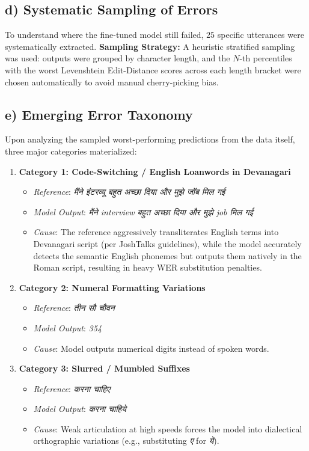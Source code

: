 \documentclass[11pt]{article}
\begin{document}
\subsection*{d) Systematic Sampling of Errors}
To understand where the fine-tuned model still failed, $25$ specific utterances were systematically extracted. \textbf{Sampling Strategy:} A heuristic stratified sampling was used: outputs were grouped by character length, and the $N$-th percentiles with the worst Levenshtein Edit-Distance scores across each length bracket were chosen automatically to avoid manual cherry-picking bias.

\subsection*{e) Emerging Error Taxonomy}
Upon analyzing the sampled worst-performing predictions from the data itself, three major categories materialized:
\begin{enumerate}[leftmargin=*]
    \def\labelitemi{--}
    \item \textbf{Category 1: Code-Switching / English Loanwords in Devanagari}
    \begin{itemize}[noitemsep]
        \item \textit{Reference}: \textsl{\texthindi{मैंने इंटरव्यू बहुत अच्छा दिया और मुझे जॉब मिल गई}} 
        \item \textit{Model Output}: \textsl{\texthindi{मैंने interview बहुत अच्छा दिया और मुझे job मिल गई}}
        \item \textit{Cause}: The reference aggressively transliterates English terms into Devanagari script (per JoshTalks guidelines), while the model accurately detects the semantic English phonemes but outputs them natively in the Roman script, resulting in heavy WER substitution penalties.
    \end{itemize}
    \item \textbf{Category 2: Numeral Formatting Variations}
    \begin{itemize}[noitemsep]
        \item \textit{Reference}: \textsl{\texthindi{तीन सौ चौवन}}
        \item \textit{Model Output}: \textsl{\texthindi{354}}
        \item \textit{Cause}: Model outputs numerical digits instead of spoken words. 
    \end{itemize}
    \item \textbf{Category 3: Slurred / Mumbled Suffixes}
    \begin{itemize}[noitemsep]
        \item \textit{Reference}: \textsl{\texthindi{करना चाहिए}}
        \item \textit{Model Output}: \textsl{\texthindi{करना चाहिये}}
        \item \textit{Cause}: Weak articulation at high speeds forces the model into dialectical orthographic variations (e.g., substituting \textsl{ए} for \textsl{ये}).
    \end{itemize}
\end{enumerate}
\end{document}
